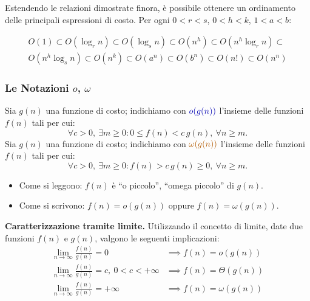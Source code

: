 \documentclass[12pt, a4paper]{article}
\begin{document}
\begin{tcolorbox}[colback=lightergray!10, colframe=tocsec, title=\textbf{Classificazione delle Funzioni}]
\label{prop:classificazione-funzioni}
Estendendo le relazioni dimostrate finora, è possibile ottenere un ordinamento delle principali espressioni di costo. Per ogni $0<r<s$, $0<h<k$, $1<a<b$:
\end{tcolorbox}
\begin{align*}
O(1) \subset O(\log_r n) \subset O(\log_s n) \subset O(n^h) \subset O(n^h\log_r n) \subset {} \\
O(n^h\log_s n) \subset O(n^k) \subset O(a^n) \subset O(b^n) \subset O(n!) \subset O(n^n)
\end{align*}

\subsubsection{Le Notazioni $o$, $\omega$}

\begin{tcolorbox}[colback=lightergray!10, colframe=tocsec, title=\textbf{Definizione: Notazioni $o$, $\omega$ (o-piccolo, omega-piccolo)}]
\label{def:o-omega-piccolo}
Sia $g(n)$ una funzione di costo; indichiamo con $\textcolor{blue!70!black}{o(g(n))}$ l'insieme delle funzioni $f(n)$ tali per cui:
$$\forall c>0,\ \exists m \ge 0 : 0 \le f(n) < c\,g(n),\ \forall n \ge m.$$
Sia $g(n)$ una funzione di costo; indichiamo con $\textcolor{orange!70!black}{\omega(g(n))}$ l'insieme delle funzioni $f(n)$ tali per cui:
$$\forall c>0,\ \exists m \ge 0 : f(n) > c\,g(n) \ge 0,\ \forall n \ge m.$$
\begin{itemize}
    \item Come si leggono: $f(n)$ è ``o piccolo'', ``omega piccolo'' di $g(n)$.
    \item Come si scrivono: $f(n) = o(g(n))$ oppure $f(n) = \omega(g(n))$.
\end{itemize}
\end{tcolorbox}

\textbf{Caratterizzazione tramite limite.} Utilizzando il concetto di limite, date due funzioni $f(n)$ e $g(n)$, valgono le seguenti implicazioni:
\begin{align*}
\lim_{n\to\infty}\frac{f(n)}{g(n)} = 0 &\implies f(n) = o(g(n)) \\
\lim_{n\to\infty}\frac{f(n)}{g(n)} = c,\ 0<c<+\infty &\implies f(n) = \Theta(g(n)) \\
\lim_{n\to\infty}\frac{f(n)}{g(n)} = +\infty &\implies f(n) = \omega(g(n))
\end{align*}
\end{document}
